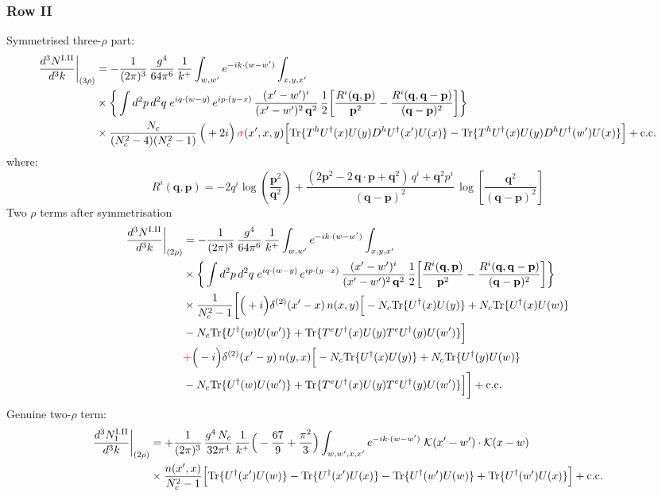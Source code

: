 \documentclass[9pt]{article}
\numberwithin{equation}{section}
\begin{document}
\subsubsection*{Row II}
Symmetrised three-$\rho$ part:
\begin{align}
\frac{d^{3}N^{\rm I.II}}{d^{3}k}\bigg|_{(3\rho)}&=-\frac{1}{(2\pi)^{3}}\,\frac{g^{4}}{64\pi^{6}}\,\frac{1}{k^{+}}\int_{w,w'}e^{-ik\cdot(w-w')}\int_{x,y,x'}\notag\\
&\times\bigg\{\int d^{2}p\,d^{2}q\;e^{iq\cdot(w-y)}\,e^{ip\cdot(y-x)}\,\frac{(x'-w')^{i}}{(x'-w')^{2}\,\mathbf{q}^{2}}\,\frac{1}{2}\bigg[\frac{R^{i}(\mathbf{q},\mathbf{p})}{\mathbf{p}^{2}}-\frac{R^{i}(\mathbf{q},\mathbf{q}-\mathbf{p})}{(\mathbf{q}-\mathbf{p})^{2}}\bigg]\bigg\}\notag\\
&\times \frac{N_{c}}{(N_{c}^{2}-4)(N_{c}^{2}-1)}\,\Big(+2i\Big)\,{\color{red}\sigma}(x',x,y)\Big[{\rm Tr}\{T^{h}U^{\dagger}(x)U(y)D^{h}U^{\dagger}(x')U(x)\}-{\rm Tr}\{T^{h}U^{\dagger}(x)U(y)D^{h}U^{\dagger}(w')U(x)\}\Big]+{\rm c.c.}\label{eq:E-I.II-3}
\end{align}
where: $$R^{i}(\mathbf{q},\mathbf{p})  = -2q^{i}\log\left(\frac{\mathbf{p}^{2}}{\mathbf{q}^{2}}\right)+\frac{(2\mathbf{p}^{2}-2\,\mathbf{q}\cdot\mathbf{p}+\mathbf{q}^{2})\,q^{i}+\mathbf{q}^{2}p^{i}}{(\mathbf{q}-\mathbf{p})^{2}}\,\log\left[\frac{\mathbf{q}^{2}}{(\mathbf{q}-\mathbf{p})^{2}}\right]$$
Two $\rho$ terms after symmetrisation
\begin{align}
\frac{d^{3}N^{\rm I.II}}{d^{3}k}\bigg|_{(2\rho)}&=-\frac{1}{(2\pi)^{3}}\,\frac{g^{4}}{64\pi^{6}}\,\frac{1}{k^{+}}\int_{w,w'}e^{-ik\cdot(w-w')}\int_{x,y,x'}\notag\\
&\times\bigg\{\int d^{2}p\,d^{2}q\;e^{iq\cdot(w-y)}\,e^{ip\cdot(y-x)}\,\frac{(x'-w')^{i}}{(x'-w')^{2}\,\mathbf{q}^{2}}\,\frac{1}{2}\bigg[\frac{R^{i}(\mathbf{q},\mathbf{p})}{\mathbf{p}^{2}}-\frac{R^{i}(\mathbf{q},\mathbf{q}-\mathbf{p})}{(\mathbf{q}-\mathbf{p})^{2}}\bigg]\bigg\}\notag\\
&\times \frac{1}{N_{c}^{2}-1}\bigg[\Big(+i\Big)\delta^{(2)}(x'-x)\,n(x,y)\Big[-N_{c}{\rm Tr}\{U^{\dagger}(x)U(y)\}+N_{c}{\rm Tr}\{U^{\dagger}(x)U(w)\}\notag\\
& -N_{c}{\rm Tr}\{U^{\dagger}(w)U(w')\}+{\rm Tr}\{T^{e}U^{\dagger}(x)U(y)T^{e}U^{\dagger}(y)U(w')\}\Big]\notag\\
& {\color{red}+}\Big(-i\Big)\delta^{(2)}(x'-y)\,n(y,x)\Big[-N_{c}{\rm Tr}\{U^{\dagger}(x)U(y)\}+N_{c}{\rm Tr}\{U^{\dagger}(y)U(w)\}\notag\\
& -N_{c}{\rm Tr}\{U^{\dagger}(w)U(w')\}+{\rm Tr}\{T^{e}U^{\dagger}(x)U(y)T^{e}U^{\dagger}(y)U(w')\}\Big]\bigg]+{\rm c.c.}\label{eq:E-I.II-2}
\end{align}
Genuine two-$\rho$ term:
\begin{align}
\frac{d^{3}N^{\rm I.II}_{1}}{d^{3}k}\bigg|_{(2\rho)} & = +\frac{1}{(2\pi)^{3}}\,\frac{g^{4}\,N_{c}}{32\pi^{4}}\,\frac{1}{k^{+}}\Big(-\frac{67}{9}+\frac{\pi^{2}}{3}\Big)\int_{w,w',x,x'} e^{-ik\cdot(w-w')}\;\mathcal{K}(x'-w')\cdot\mathcal{K}(x-w)\notag \\
& \times\frac{n(x',x)}{N_{c}^{2}-1}\Big[{\rm Tr}\{U^{\dagger}(x')U(w)\}-{\rm Tr}\{U^{\dagger}(x')U(x)\}-{\rm Tr}\{U^{\dagger}(w')U(w)\}+{\rm Tr}\{U^{\dagger}(w')U(x)\}\Big]+{\rm c.c.}\label{eq:E-I.II-2o}
\end{align}
\end{document}
